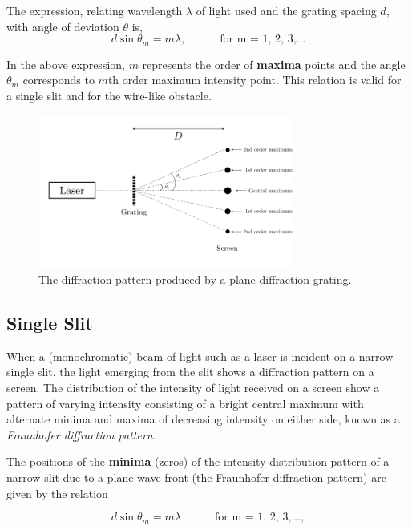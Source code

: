 The expression, relating wavelength $\lambda$ of light used and the grating spacing $d$, with angle of deviation $\theta$ is,    
\begin{equation*}
    d \sin{\theta_m} = m \lambda,  \quad\quad\quad \text{for    m  = 1, 2, 3,}\hdots
\end{equation*}

In the above expression, $m$ represents the order of \textbf{maxima} points and the angle $\theta_m$  corresponds to  $m$th  order maximum intensity point. This relation is valid for a single slit and for the wire-like obstacle.

\begin{figure}[!htb]
    \centering
    \includegraphics[width=0.75\textwidth]{figs/grating.png}
    \caption{The diffraction pattern produced by a plane diffraction grating.}
    \label{fig:grating}
\end{figure}

\subsection*{Single Slit}

When a (monochromatic) beam of light such as a laser is incident on a narrow single slit, the light emerging from the slit shows a diffraction pattern on a screen. The distribution of the intensity of light received on a screen show a pattern of varying intensity consisting of a bright central maximum with alternate minima and maxima of decreasing intensity on either side, known as a \textit{Fraunhofer diffraction pattern}.

The positions of the \textbf{minima} (zeros) of the intensity distribution pattern of a narrow slit due to a plane wave front (the Fraunhofer diffraction pattern) are given by the relation 

\begin{equation*}
    d \sin{\theta_m} = m \lambda  \quad\quad\quad \text{for    m  = 1, 2, 3,}\hdots,
\end{equation*}

